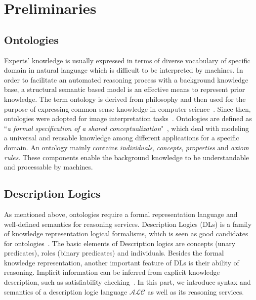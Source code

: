\documentclass{article}
\begin{document}
\section{Preliminaries}\label{sec:pre}
\subsection{Ontologies}
Experts' knowledge is usually expressed in terms of diverse vocabulary of specific domain in natural language which is difficult to be interpreted by machines.
In order to facilitate an automated reasoning process with a background knowledge base, a structural semantic based model is  an effective means to represent prior knowledge.
The term ontology is derived from philosophy and then used for the purpose of expressing common sense knowledge in computer science~\cite{alexander1986knowledge}.
Since then, ontologies were adopted for image interpretation tasks~\cite{bannour2011towards,Hudelot2008fuzzy,town2006ontological}.
Ontologies are defined as “\textit{a formal specification of a shared conceptualization}"~\cite{studer1998knowledge},
which deal with modeling a universal and reusable knowledge among different applications for a specific domain.
An ontology mainly contains  \textit{individuals}, \textit{concepts}, \textit{properties} and \textit{axiom rules}. 
These components enable the background knowledge to be understandable and processable by machines.

\subsection{Description Logics}
As mentioned above, ontologies require a formal representation language and well-defined semantics for reasoning services. 
Description Logics (DLs) is a family of knowledge representation logical formalisms, which is seen as good candidates for ontologies~\cite{horrocks1999description}.
The basic elements of Description logics are concepts (unary predicates), roles (binary predicates) and individuals.
Besides the formal knowledge representation, another important feature of DLs is their ability of reasoning.
Implicit information can be inferred from explicit knowledge description, such as satisfiability checking~\cite{baader2003description}. 
In this part, we introduce syntax and semantics of a description logic language $\mathcal{ALC}$ as well as its reasoning services.
\end{document}
